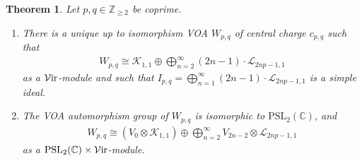 \documentclass[pdftex]{sigma}
\numberwithin{equation}{section}
\newtheorem{Theorem}{Theorem}[section]
\theoremstyle{definition}
\begin{document}
\begin{Theorem}\label{thm1}
Let $p,q\in\mathbb{Z}_{\geq 2}$ be coprime.
\begin{enumerate}\itemsep=0pt
\item[$(1)$] There is a unique up to isomorphism VOA $W_{p,q}$ of central charge $c_{p,q}$ such that
\begin{gather*}
W_{p,q}\cong\mathcal{K}_{1,1}\oplus\bigoplus_{n=2}^\infty (2n-1)\cdot\mathcal{L}_{2np-1,1}
\end{gather*}
as a $\mathcal{V}{\rm ir}$-module and such that $I_{p,q}=\bigoplus_{n=1}^\infty (2n-1)\cdot\mathcal{L}_{2np-1,1}$ is a simple ideal.

\item[$(2)$] The VOA automorphism group of $W_{p,q}$ is isomorphic to $\mathrm{PSL}_2(\mathbb{C})$, and
\begin{gather}\label{eqn:Wpq-final-decomp}
W_{p,q}\cong (V_0\otimes\mathcal{K}_{1,1})\oplus\bigoplus_{n=2}^\infty V_{2n-2}\otimes\mathcal{L}_{2np-1,1}
\end{gather}
as a $\mathrm{PSL}_2(\mathbb{C})\times\mathcal{V}{\rm ir}$-module.
\end{enumerate}
\end{Theorem}
\end{document}
